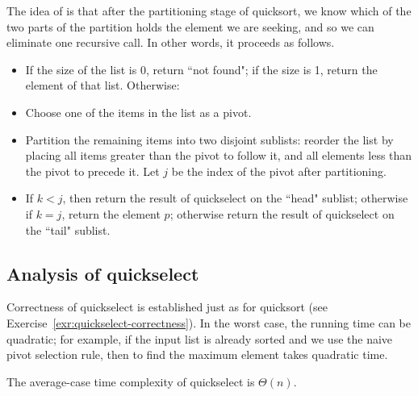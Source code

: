 The idea of  is that after the partitioning stage of quicksort, 
we know which of the two parts of the partition holds the element we are seeking, 
and so we can eliminate one recursive call. In other words, it proceeds as follows.
\begin{itemize}
\item  If the size of the list is 0, return ``not found"; if the size is 1, 
return the element of that list. Otherwise:
\item Choose one of the items in the list as a pivot. 
\item Partition the remaining items into two disjoint sublists: 
reorder the list by placing all items greater than the pivot to follow it,
 and all elements less than the pivot to precede it. Let $j$ be the index of the 
 pivot after partitioning.
\item If $k < j$, then return the result of quickselect on the ``head" sublist; 
otherwise if $k = j$, return the element $p$; otherwise return the result of 
quickselect on the ``tail" sublist.
\end{itemize}


\subsection*{Analysis of quickselect}

Correctness of quickselect is established just as for quicksort 
(see Exercise~\ref{exr:quickselect-correctness}). In the worst case, the running
time can be quadratic; for example, if the input list is already sorted and we 
use the naive pivot selection rule, then to find the maximum element takes 
quadratic time. 

\begin{Theorem}\label{t:quickselect-average} 
The average-case time complexity of quickselect is $\Theta(n)$.  
\end{Theorem}

